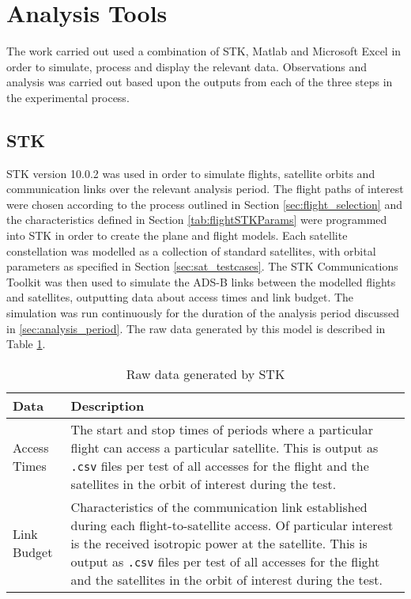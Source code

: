 \section{Analysis Tools}
The work carried out used a combination of STK, Matlab and Microsoft Excel in order to simulate, process and display the relevant data. Observations and analysis was carried out based upon the outputs from each of the three steps in the experimental process.
\subsection{STK}
STK version 10.0.2 was used in order to simulate flights, satellite orbits and communication links over the relevant analysis period. The flight paths of interest were chosen according to the process outlined in Section \ref{sec:flight_selection} and the characteristics defined in Section \ref{tab:flightSTKParams} were programmed into STK in order to create the plane and flight models. Each satellite constellation was modelled as a collection of standard satellites, with orbital parameters as specified in Section \ref{sec:sat_testcases}. The STK Communications Toolkit was then used to simulate the ADS-B links between the modelled flights and satellites, outputting data about access times and link budget. The simulation was run continuously for the duration of the analysis period discussed in \ref{sec:analysis_period}. The raw data generated by this model is described in Table \ref{tab:STKData}.

\begin{table}[htbp]
  \centering
  \caption{Raw data generated by STK}
    \begin{tabular}{lp{10cm}}
    \toprule
    Data & Description \\
    \midrule
    Access Times & The start and stop times of periods where a particular flight can access a particular satellite. This is output as \Verb|.csv| files per test of all accesses for the flight and the satellites in the orbit of interest during the test.  \\
    Link Budget & Characteristics of the communication link established during each flight-to-satellite access. Of particular interest is the received isotropic power at the satellite. This is output as \Verb|.csv| files per test of all accesses for the flight and the satellites in the orbit of interest during the test.  \\
    \bottomrule
    \end{tabular}%
  \label{tab:STKData}%
\end{table}%

